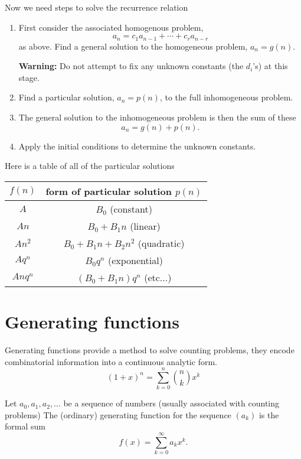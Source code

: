 \documentclass[10pt, a4paper]{article}
\begin{document}
Now we need steps to solve the recurrence relation
\begin{enumerate}[label = \textbf{Step \arabic*}]
    \item First consider the associated homogenous problem,
    \[
    a_n = c_1a_{n - 1} + \dotsi + c_ra_{n - r}
    \]
    as above.
    Find a general solution to the homogeneous problem,
    $a_n = g(n)$.
    
    \textbf{Warning:} Do not attempt to fix any unknown constants
    (the $d_i$'s)
    at this stage.
    \item Find a particular solution,
    $a_n = p(n)$,
    to the full inhomogeneous problem.
    \item The general solution to the inhomogeneous problem is then the sum of these
    \[
    a_n = g(n) + p(n).
    \]
    \item Apply the initial conditions to determine the unknown constants.
\end{enumerate}

Here is a table of all of the particular solutions
\begin{table}[H]
    \centering
    \begin{tabular}{c|c}
         $f(n)$ & form of particular solution $p(n)$ \\
         \hline
         $A$ & $B_0$ (constant) \\
         $An$ & $B_0 + B_1n$ (linear) \\
         $An ^ 2$ & $B_0 + B_1n + B_2n ^ 2$ (quadratic) \\
         $Aq ^ n$ & $B_0q ^ n$ (exponential) \\
         $Anq ^ n$ & $(B_0 + B_1n)q ^ n$ (etc$\dotsc$)
    \end{tabular}
\end{table}

\newpage

\section{Generating functions}
Generating functions provide a method to solve counting problems,
they encode combinatorial information into a continuous analytic form.
\[
(1 + x) ^ n = \sum_{k = 0} ^ n\binom{n}{k}x ^ k
\]
\begin{definition}
    Let $a_0, a_1, a_2, \dotsc$ be a sequence of numbers
    (usually associated with counting problems)
    The
    (ordinary)
    generating function for the sequence $(a_k)$ is the formal sum
    \[
    f(x) = \sum_{k = 0}^{\infty}a_kx ^ k.
    \]
\end{definition}
\end{document}
